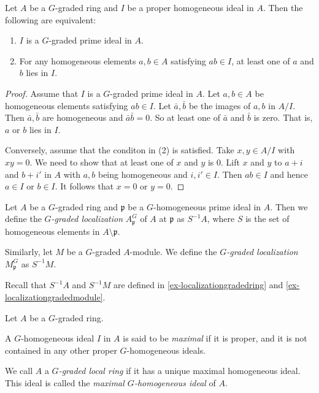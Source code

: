 \begin{proposition}
    Let $A$ be a $G$-graded ring and $I$ be a proper homogeneous ideal in $A$. Then the following are equivalent:
    \begin{enumerate}
        \item $I$ is a $G$-graded prime ideal in $A$.
        \item For any homogeneous elements $a,b\in A$ satisfying $ab\in I$, at least one of $a$ and $b$ lies in $I$.
    \end{enumerate}
\end{proposition}
\begin{proof}
    Assume that $I$ is a $G$-graded prime ideal in $A$. Let $a,b\in A$ be homogeneous elements satisfying $ab\in I$. Let $\bar{a},\bar{b}$ be the images of $a,b$ in $A/I$. Then $\bar{a},\bar{b}$ are homogeneous and $\bar{a}\bar{b}=0$. So at least one of $\bar{a}$ and $\bar{b}$ is zero. That is, $a$ or $b$ lies in $I$.

    Conversely, assume that the conditon in (2) is satisfied. Take $x,y\in A/I$ with $xy=0$. We need to show that at least one of $x$ and $y$ is $0$. Lift $x$ and $y$ to $a+i$ and $b+i'$ in $A$ with $a,b$ being homogeneous and $i,i'\in I$. Then $ab\in I$ and hence $a\in I$ or $b\in I$. It follows that $x=0$ or $y=0$. 
\end{proof}



\begin{definition}
    Let $A$ be a $G$-graded ring and $\mathfrak{p}$ be a $G$-homogeneous prime ideal in $A$. Then we define the \emph{$G$-graded localization} $A^G_{\mathfrak{p}}$ of $A$ at $\mathfrak{p}$  as $S^{-1}A$, where $S$ is the set of homogeneous elements in $A\setminus \mathfrak{p}$.

    Similarly, let $M$ be a $G$-graded $A$-module. We define the \emph{$G$-graded localization} $M^G_{\mathfrak{p}}$ as $S^{-1}M$.
\end{definition}
Recall that $S^{-1}A$ and $S^{-1}M$ are defined in \cref{ex-localizationgradedring} and \cref{ex-localizationgradedmodule}. 

\begin{definition}
    Let $A$ be a $G$-graded ring.

    A $G$-homogeneous ideal $I$ in $A$ is said to be \emph{maximal} if it is proper, and it is not contained in any other proper $G$-homogeneous ideals.

    We call $A$ a \emph{$G$-graded local ring} if it has a unique maximal homogeneous ideal. This ideal is called the \emph{maximal $G$-homogeneous ideal} of $A$.
\end{definition}



